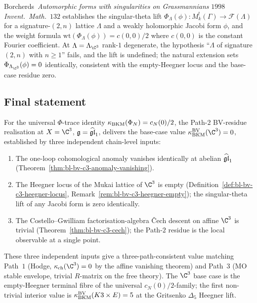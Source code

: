 \begin{remark}[Borcherds 1998]
\label{rem:bl-bv-c3-borcherds}
Borcherds~\textit{Automorphic forms with singularities on Grassmannians}
$1998$ \textit{Invent.\ Math.}~$132$ establishes the singular-theta
lift $\Phi_\Lambda(\phi) : M_k^!(\Gamma) \to \mathcal{F}(\Lambda)$
for a signature-$(2, n)$ lattice $\Lambda$ and a weakly holomorphic
Jacobi form $\phi$, and the weight formula
$\mathrm{wt}(\Phi_\Lambda(\phi)) = c(0, 0)/2$ where $c(0, 0)$ is
the constant Fourier coefficient. At $\Lambda = \Lambda_{\C^3}$
rank-$1$ degenerate, the hypothesis ``$\Lambda$ of signature $(2, n)$
with $n\geq 1$'' fails, and the lift is undefined; the natural
extension sets $\Phi_{\Lambda_{\C^3}}(\phi) = 0$ identically,
consistent with the empty-Heegner locus and the base-case residue
zero.
\end{remark}

\subsection*{Final statement}

\begin{theorem}
\label{thm:bl-bv-c3-final}
\ClaimStatusProvedHere
For the universal $\Phi$-trace identity
$\kappa_{\mathrm{BKM}}(\Phi_N) = c_N(0)/2$, the Path-$2$ BV-residue realisation at
$X = \C^3$, $\mathfrak{g} = \widehat{\mathfrak{gl}}_1$, delivers the base-case value
$\kBKM^{\mathrm{BV}}(\C^3) = 0$, established by three independent
chain-level inputs:
\begin{enumerate}[label=\textup{(\alph*)}]
\item The one-loop cohomological anomaly vanishes identically at
abelian $\widehat{\mathfrak{gl}}_1$ (Theorem~\ref{thm:bl-bv-c3-anomaly-vanishing}).
\item The Heegner locus of the Mukai lattice of $\C^3$ is empty
(Definition~\ref{def:bl-bv-c3-heegner-locus},
Remark~\ref{rem:bl-bv-c3-heegner-empty}); the singular-theta lift
of any Jacobi form is zero identically.
\item The Costello--Gwilliam factorisation-algebra \v{C}ech descent
on affine $\C^3$ is trivial (Theorem~\ref{thm:bl-bv-c3-cech}); the
Path-$2$ residue is the local observable at a single point.
\end{enumerate}
These three independent inputs give a three-path-consistent value
matching Path~$1$ (Hodge, $\kch(\C^3) = 0$ by the affine vanishing
theorem) and Path~$3$ (MO stable envelope, trivial $R$-matrix on
the free theory). The $\C^3$ base case is the empty-Heegner
terminal fibre of the universal $c_N(0)/2$-family; the first
non-trivial interior value is $\kappa_{\mathrm{BKM}}^{\mathrm{BV}}(K3\times E)
= 5$ at the Gritsenko $\Delta_5$ Heegner lift.
\end{theorem}

